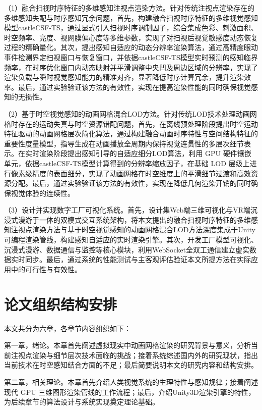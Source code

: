 （1）融合扫视时序特征的多维感知注视点渲染方法。针对传统注视点渲染存在的多维感知失配与时序感知冗余问题，首先，构建融合扫视时序特征的多维视觉感知模型castleCSF-TS，通过显式引入扫视时序调制因子，综合集成色彩、刺激面积、时空频率、亮度、视网膜偏心度等多维参数，实现了对扫视后视觉敏感度动态恢复过程的精确量化。其次，提出感知自适应的动态分辨率渲染算法，通过高精度眼动事件检测界定扫视窗口与恢复窗口，并依据castleCSF-TS模型实时预测的感知临界频率，在时序优化窗口内动态映射并平滑调整中央凹及周边区域的分辨率，实现了渲染负载与瞬时视觉感知能力的精准对齐，显著降低时序计算冗余，提升渲染效率。最后，通过实验验证该方法的有效性，实现在提高渲染性能的同时确保视觉感知的无损性。

（2）基于时空视觉感知的动画网格混合LOD方法。针对传统LOD技术处理动画网格时存在的运动失真与时空资源错配问题，首先，在离线预处理阶段提出时空运动特征驱动的动画网格层次简化算法，通过构建融合动画时序特性与空间结构特征的重要性度量模型，指导生成在动画播放全周期内保持视觉连贯性的多层次细节表示。在实时渲染阶段提出感知引导的自适应细分LOD算法，利用 GPU 硬件镶嵌单元，依据castleCSF-TS模型计算得到的分辨率缩放因子，在基础 LOD 层级上进行像素级精度的表面细分，实现了动画网格在时空维度上的平滑细节过渡和高效资源分配。最后，通过实验验证该方法的有效性，实现在降低几何渲染开销的同时确保视觉体验的连续性。


（3）设计并实现数字工厂可视化系统。首先，设计集Web端三维可视化与VR端沉浸式漫游于一体的双模式交互系统架构，将本文提出的融合扫视时序特征的多维感知注视点渲染方法与基于时空视觉感知的动画网格混合LOD方法深度集成于Unity可编程渲染管线，构建感知自适应的实时渲染引擎。其次，开发工厂模型可视化、沉浸式漫游、数据通信与监控等核心模块，利用WebSocket全双工通信建立虚实数据实时同步。最后，通过系统的性能测试与主客观评估验证本文所提方法在实际应用中的可行性与有效性。



\section{论文组织结构安排}
本文共分为六章，各章节内容组织如下：

第一章，绪论。本章首先阐述虚拟现实中动画网格渲染的研究背景与意义，分析当前注视点渲染与细节层次技术面临的挑战；接着系统综述国内外的研究现状，指出当前技术在时空感知结合方面的不足；最后简要说明本文的研究内容和结构安排。

第二章，相关理论。本章首先介绍人类视觉系统的生理特性与感知规律；接着阐述现代 GPU 三维图形渲染管线的工作流程；最后，介绍Unity3D渲染引擎的特性，为后续章节的算法设计与系统实现奠定理论基础。

